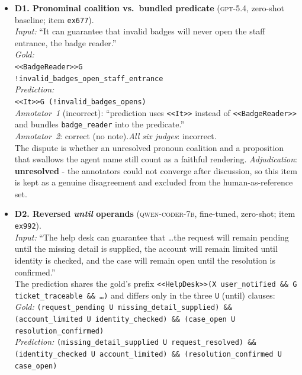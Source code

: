 \documentclass[letterpaper]{article}
\begin{document}
{\small\sloppy\setlength{\emergencystretch}{3em}
\begin{itemize}[leftmargin=1.3em,itemsep=7pt]
  \item \textbf{D1. Pronominal coalition vs.\ bundled predicate} (\textsc{gpt-5.4}, zero-shot baseline; item \texttt{ex677}).\\
  \emph{Input:} ``It can guarantee that invalid badges will never open the staff entrance, the badge reader.''\\
\emph{Gold:}\\
{\texttt{<<BadgeReader>>G \\!invalid\_badges\_open\_staff\_entrance}}\\
\emph{Prediction:}\\
{\texttt{<<It>>G (!invalid\_badges\_opens)}}\\
  \emph{Annotator~1} (incorrect): ``prediction uses \texttt{<<It>>} instead of \texttt{<<BadgeReader>>} and bundles \texttt{badge\_reader} into the predicate.''\\
  \emph{Annotator~2}: correct (no note).\quad\emph{All six judges}: incorrect.\\
  The dispute is whether an unresolved pronoun coalition and a proposition that swallows the agent name still count as a faithful rendering. \emph{Adjudication}: \textbf{unresolved} - the annotators could not converge after discussion, so this item is kept as a genuine disagreement and excluded from the human-as-reference set.
  \item \textbf{D2. Reversed \emph{until} operands} (\textsc{qwen-coder-7b}, fine-tuned, zero-shot; item \texttt{ex992}).\\
  \emph{Input:} ``The help desk can guarantee that \ldots the request will remain pending until the missing detail is supplied, the account will remain limited until identity is checked, and the case will remain open until the resolution is confirmed.''\\
  The prediction shares the gold's prefix \texttt{<<HelpDesk>>(X user\_notified \&\& G ticket\_traceable \&\& \ldots)} and differs only in the three \texttt{U} (until) clauses:\\
  \emph{Gold:} \texttt{(request\_pending U missing\_detail\_supplied) \&\& (account\_limited U identity\_checked) \&\& (case\_open U resolution\_confirmed)}\\
  \emph{Prediction:} \texttt{(missing\_detail\_supplied U request\_resolved) \&\& (identity\_checked U account\_limited) \&\& (resolution\_confirmed U case\_open)}\\

\end{itemize}}
\end{document}
